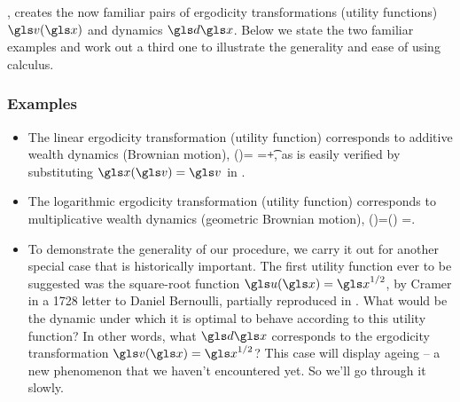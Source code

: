 , creates the now familiar pairs of ergodicity transformations (utility functions) $\gv(\x)$ and dynamics
$\gd\x$. Below we state the two familiar examples and work out a third one to illustrate the generality and
ease of using \Ito calculus.

\subsubsection{Examples}
\begin{itemize}
\item
The linear ergodicity transformation (utility function) corresponds to additive wealth dynamics (Brownian motion),
\be
\gv(\x)=\x \hspace{.4cm} \leftrightarrow \hspace{.4cm} \gd\x=\av \gd\t +\bv \gd\gW,\hspace{1.3cm}
\ee
as is easily verified by substituting $\x(\gv)=\gv$ in .
\item
The logarithmic ergodicity transformation (utility function) corresponds to multiplicative wealth dynamics (geometric Brownian motion),
\be
\gv(\x)=\ln(\x) \hspace{.4cm} \leftrightarrow \hspace{.4cm} \gd\x=\x{}.
\ee
\item
To demonstrate the generality of our procedure, we carry it out for another 
special case that is historically important. The first utility function ever to be 
suggested was the square-root 
function $\gu(\x)=\x^{1/2}$, by Cramer in a 1728 letter to Daniel Bernoulli, 
partially reproduced in \cite{Bernoulli1738}. What would be the dynamic 
under which it is optimal to behave according to this utility function? In 
other words, what $\gd\x$ corresponds to the ergodicity transformation $\gv(\x)=\x^{1/2}$?
This case will display ageing -- a new phenomenon that we haven't encountered yet. So we'll go through it slowly.


\end{itemize}
